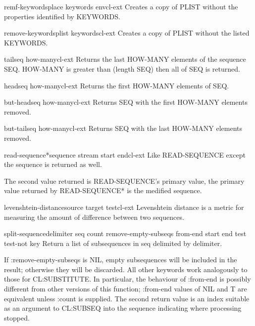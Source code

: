 \begin{macro}{remf-keywords}{place \rest keywords \env env}{cl-ext}{}
  Creates a copy of PLIST without the properties identified by KEYWORDS.
\end{macro}

\begin{function}{remove-keywords}{plist \rest keywords}{cl-ext}{}
  Creates a copy of PLIST without the listed KEYWORDS.
\end{function}

\begin{function}{tail}{seq \op how-many}{cl-ext}{}
  Returns the last HOW-MANY elements of the sequence SEQ. HOW-MANY is
  greater than (length SEQ) then all of SEQ is returned.
\end{function}

\begin{function}{head}{seq \op how-many}{cl-ext}{}
  Returns the first HOW-MANY elements of SEQ.
\end{function}

\begin{function}{but-head}{seq \op how-many}{cl-ext}{}
  Returns SEQ with the first HOW-MANY elements removed.
\end{function}

\begin{function}{but-tail}{seq \op how-many}{cl-ext}{}
  Returns SEQ with the last HOW-MANY elements removed.
\end{function}

\begin{function}{read-sequence*}{sequence stream \key start end}{cl-ext}{}
  Like READ-SEQUENCE except the sequence is returned as well.

The second value returned is READ-SEQUENCE's primary value, the
primary value returned by READ-SEQUENCE* is the medified
sequence.
\end{function}

\begin{function}{levenshtein-distance}{source target \key test}{cl-ext}{}
  Levenshtein distance is a metric for measuring the amount of
  difference between two sequences.
\end{function}

\begin{function}{split-sequence}{delimiter seq \key count
    remove-empty-subseqs from-end start end test test-not key}{}{}
  Return a list of subsequences in seq delimited by delimiter.

If :remove-empty-subseqs is NIL, empty subsequences will be included
in the result; otherwise they will be discarded.  All other keywords
work analogously to those for CL:SUBSTITUTE.  In particular, the
behaviour of :from-end is possibly different from other versions of
this function; :from-end values of NIL and T are equivalent unless
:count is supplied. The second return value is an index suitable as an
argument to CL:SUBSEQ into the sequence indicating where processing
stopped.
\end{function}

